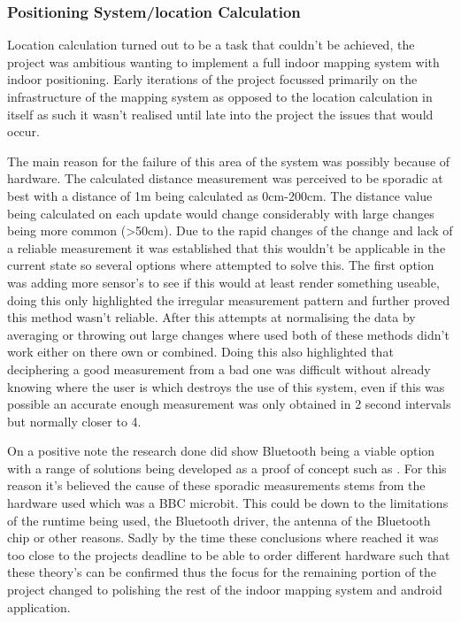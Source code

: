 \subsubsection{Positioning System/location Calculation}
Location calculation turned out to be a task that couldn't be achieved, the project was ambitious wanting to implement a full indoor mapping system with indoor positioning. Early iterations of the project focussed primarily on the infrastructure of the mapping system as opposed to the location calculation in itself as such it wasn't realised until late into the project the issues that would occur.

The main reason for the failure of this area of the system was possibly because of hardware. The calculated distance measurement was perceived to be sporadic at best with a distance of 1m being calculated as 0cm-200cm. The distance value being calculated on each update would change considerably with large changes being more common (>50cm). Due to the rapid changes of the change and lack of a reliable measurement it was established that this wouldn't be applicable in the current state so several options where attempted to solve this. The first option was adding more sensor's to see if this would at least render something useable, doing this only highlighted the irregular measurement pattern and further proved this method wasn't reliable.
After this attempts at normalising the data by averaging or throwing out large changes where used both of these methods didn't work either on there own or combined. Doing this also highlighted that deciphering a good measurement from a bad one was difficult without already knowing where the user is which destroys the use of this system, even if this was possible an accurate enough measurement was only obtained in 2 second intervals but normally closer to 4.

On a positive note the research done did show Bluetooth being a viable option with a range of solutions being developed as a proof of concept such as \cite{kingatua_2020_bluetooth}. For this reason it's believed the cause of these sporadic measurements stems from the hardware used which was a BBC microbit. This could be down to the limitations of the runtime being used, the Bluetooth driver, the antenna of the Bluetooth chip or other reasons. Sadly by the time these conclusions where reached it was too close to the projects deadline to be able to order different hardware such that these theory's can be confirmed thus the focus for the remaining portion of the project changed to polishing the rest of the indoor mapping system and android application.

